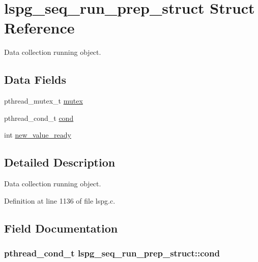 \hypertarget{structlspg__seq__run__prep__struct}{\section{lspg\-\_\-seq\-\_\-run\-\_\-prep\-\_\-struct Struct Reference}
\label{structlspg__seq__run__prep__struct}
}


Data collection running object.  


\subsection*{Data Fields}
\begin{DoxyCompactItemize}
\item 
pthread\-\_\-mutex\-\_\-t \hyperlink{structlspg__seq__run__prep__struct_ad146cb91b5f7dd8bb283092c28781fe7}{mutex}
\item 
pthread\-\_\-cond\-\_\-t \hyperlink{structlspg__seq__run__prep__struct_acd83ea6994f57377716ff01c8ee7ce43}{cond}
\item 
int \hyperlink{structlspg__seq__run__prep__struct_a42d08888327e9059ddd69ddfec31b8a9}{new\-\_\-value\-\_\-ready}
\end{DoxyCompactItemize}


\subsection{Detailed Description}
Data collection running object. 

Definition at line 1136 of file lspg.\-c.



\subsection{Field Documentation}
\hypertarget{structlspg__seq__run__prep__struct_acd83ea6994f57377716ff01c8ee7ce43}{
\subsubsection[{cond}]{\setlength{\rightskip}{0pt plus 5cm}pthread\-\_\-cond\-\_\-t lspg\-\_\-seq\-\_\-run\-\_\-prep\-\_\-struct\-::cond}}\label{structlspg__seq__run__prep__struct_acd83ea6994f57377716ff01c8ee7ce43}


